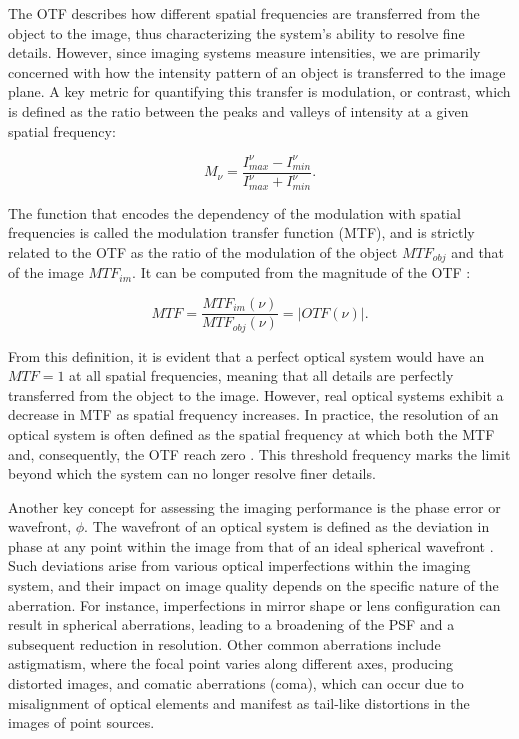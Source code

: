 The OTF describes how different spatial frequencies are transferred from the object to the image, thus characterizing the system's ability to resolve fine details. However, since imaging systems measure intensities, we are primarily concerned with how the intensity pattern of an object is transferred to the image plane. A key metric for quantifying this transfer is modulation, or contrast, which is defined as the ratio between the peaks and valleys of intensity at a given spatial frequency:

\begin{equation}
  M _ {\nu} = \frac{I_{max} ^{\nu} - I_{min} ^{\nu}}{I_{max} ^{\nu} + I_{min} ^{\nu}}.
\end{equation}

The function that encodes the dependency of the modulation with spatial frequencies is called the modulation transfer function (MTF), and is strictly related to the OTF as the ratio of the modulation of the object $MTF_{obj}$ and that of the image $MTF_{im}$. It can be computed from the magnitude of the OTF \citep{OTF}:

\begin{equation}
  MTF = \frac{MTF_{im}(\nu)}{MTF_{obj}(\nu)} = | OTF(\nu) |.
\end{equation}

From this definition, it is evident that a perfect optical system would have an $MTF=1$ at all spatial frequencies, meaning that all details are perfectly transferred from the object to the image. However, real optical systems exhibit a decrease in MTF as spatial frequency increases. In practice, the resolution of an optical system is often defined as the spatial frequency at which both the MTF and, consequently, the OTF reach zero \citep{wfes}. This threshold frequency marks the limit beyond which the system can no longer resolve finer details. 

Another key concept for assessing the imaging performance is the phase error or wavefront, $\phi$. The wavefront of an optical system is defined as the deviation in phase at any point within the image from that of an ideal spherical wavefront \citep{WFE_def}. Such deviations arise from various optical imperfections within the imaging system, and their impact on image quality depends on the specific nature of the aberration. For instance, imperfections in mirror shape or lens configuration can result in spherical aberrations, leading to a broadening of the PSF and a subsequent reduction in resolution. Other common aberrations include astigmatism, where the focal point varies along different axes, producing distorted images, and comatic aberrations (coma), which can occur due to misalignment of optical elements and manifest as tail-like distortions in the images of point sources.

